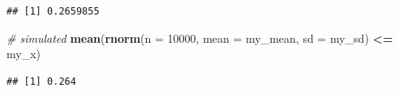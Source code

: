 \documentclass[]{book}
\newenvironment{Shaded}{\begin{snugshade}}{\end{snugshade}}
\newcommand{\CommentTok}[1]{\textcolor[rgb]{0.56,0.35,0.01}{\textit{#1}}}
\newcommand{\DataTypeTok}[1]{\textcolor[rgb]{0.13,0.29,0.53}{#1}}
\newcommand{\DecValTok}[1]{\textcolor[rgb]{0.00,0.00,0.81}{#1}}
\newcommand{\KeywordTok}[1]{\textcolor[rgb]{0.13,0.29,0.53}{\textbf{#1}}}
\newcommand{\NormalTok}[1]{#1}
\newcommand{\OperatorTok}[1]{\textcolor[rgb]{0.81,0.36,0.00}{\textbf{#1}}}
\newcommand{\StringTok}[1]{\textcolor[rgb]{0.31,0.60,0.02}{#1}}
\begin{document}
\begin{verbatim}
## [1] 0.2659855
\end{verbatim}

\begin{Shaded}
\begin{Highlighting}[]
\CommentTok{# simulated}
\KeywordTok{mean}\NormalTok{(}\KeywordTok{rnorm}\NormalTok{(}\DataTypeTok{n =} \DecValTok{10000}\NormalTok{, }\DataTypeTok{mean =}\NormalTok{ my_mean, }\DataTypeTok{sd =}\NormalTok{ my_sd) }\OperatorTok{<=}\StringTok{ }\NormalTok{my_x)}
\end{Highlighting}
\end{Shaded}

\begin{verbatim}
## [1] 0.264
\end{verbatim}
\end{document}
